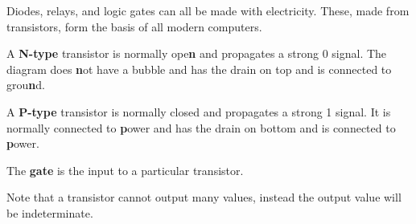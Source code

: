 
Diodes, relays, and logic gates can all be made with electricity. These, made from transistors, form the basis of all modern computers.

\begin{definition}
	A \textbf{N-type} transistor is normally ope\textbf{n} and propagates a strong 0 signal. The diagram does \textbf{n}ot have a bubble and has the drain on top and is connected to grou\textbf{n}d.
\end{definition}

\begin{definition}
	A \textbf{P-type} transistor is normally closed and propagates a strong 1 signal. It is normally connected to \textbf{p}ower and has the drain on bottom and is connected to \textbf{p}ower.
\end{definition}

\begin{definition}
	The \textbf{gate} is the input to a particular transistor.
\end{definition}

Note that a transistor cannot output many values, instead the output value will be indeterminate.
